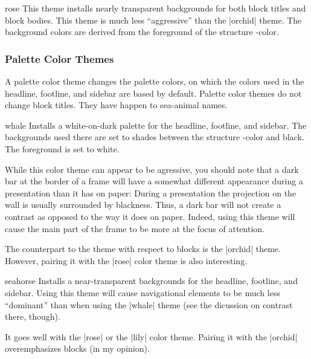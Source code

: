 \begin{colorthemeexample}{rose}
  This theme installs nearly transparent backgrounds for both block
  titles and block bodies. This theme is much less ``aggressive'' than
  the |orchid| theme. The background colors are derived from the
  foreground of the structure \beamer-color.
\end{colorthemeexample}


\subsubsection{Palette Color Themes}

A palette color theme  changes the palette colors, on which the colors
used in the headline, footline, and sidebar 
are based by default. Palette color themes do not change block
titles. They have happen to sea-animal names.

\begin{colorthemeexample}{whale}
  Installs a white-on-dark palette for the headline, footline, and
  sidebar. The backgrounds used there are set to shades between the
  structure \beamer-color and black. The foreground is set to
  white.

  While this color theme can appear to be agressive, you should note
  that a dark bar at the border of a frame will have a somewhat
  different appearance during a presentation than it has on paper:
  During a presentation the projection on the 
  wall is usually surrounded by blackness. Thus, a dark bar will
  not create a contrast as opposed to the way it does on
  paper. Indeed, using this theme will cause the main part of the
  frame to be more at the focus of attention.

  The counterpart to the theme with respect to blocks is the |orchid|
  theme. However, pairing it with the |rose| color theme is also
  interesting. 
\end{colorthemeexample}

\begin{colorthemeexample}{seahorse}
  Installs a near-transparent backgrounds for the headline, footline,
  and sidebar. Using this theme will cause navigational elements to be
  much less ``dominant'' than when using the |whale| theme (see the
  dicussion on contrast there, though).

  It goes well with the |rose| or the |lily| color theme. Pairing it
  with the |orchid| overemphasizes blocks (in my opinion).
\end{colorthemeexample}




